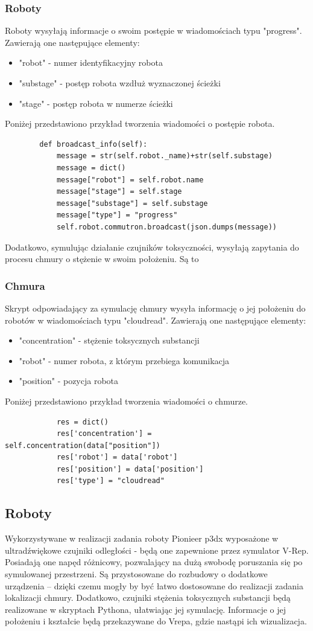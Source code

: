 \documentclass[a4paper, 12pt]{article}
\begin{document}
	\subsubsection{Roboty}
	Roboty wysyłają informacje o swoim postępie w wiadomościach typu "progress". Zawierają one następujące elementy:
	\begin{itemize}
	\item "robot" - numer identyfikacyjny robota
	\item "substage" - postęp robota wzdłuż wyznaczonej ścieżki
	\item "stage" - postęp robota w numerze ścieżki
	\end{itemize}
	Poniżej przedstawiono przykład tworzenia wiadomości o postępie robota.
	\begin{verbatim}
	    def broadcast_info(self):
	        message = str(self.robot._name)+str(self.substage)
	        message = dict()
	        message["robot"] = self.robot.name
	        message["stage"] = self.stage
	        message["substage"] = self.substage
	        message["type"] = "progress"
	        self.robot.commutron.broadcast(json.dumps(message))
	\end{verbatim}
	Dodatkowo, symulując działanie czujników toksyczności, wysyłają zapytania do procesu chmury o stężenie w swoim położeniu. Są to
	\subsubsection{Chmura}
	Skrypt odpowiadający za symulację chmury wysyła informację o jej położeniu do robotów w wiadomościach typu "cloudread".
	Zawierają one następujące elementy:
	\begin{itemize}
	\item "concentration" - stężenie toksycznych substancji
	\item "robot" - numer robota, z którym przebiega komunikacja
	\item "position" - pozycja robota
	\end{itemize}
	Poniżej przedstawiono przykład tworzenia wiadomości o chmurze.
	\begin{verbatim}
	        res = dict()
	        res['concentration'] = self.concentration(data["position"])
	        res['robot'] = data['robot']
	        res['position'] = data['position']
	        res['type'] = "cloudread"
	\end{verbatim}
	
	
	\subsection{Roboty}
	Wykorzystywane w realizacji zadania roboty Pionieer p3dx wyposażone w ultradźwiękowe czujniki odległości - będą one zapewnione przez symulator V-Rep. Posiadają one napęd różnicowy, pozwalający na dużą swobodę poruszania się po symulowanej przestrzeni. Są przystosowane do rozbudowy o dodatkowe urządzenia -- dzięki czemu mogły by być łatwo dostosowane do realizacji zadania lokalizacji chmury.
	Dodatkowo, czujniki stężenia toksycznych substancji będą realizowane w skryptach Pythona, ułatwiając jej symulację. Informacje o jej położeniu i kształcie będą przekazywane do Vrepa, gdzie nastąpi ich wizualizacja.
	
\end{document}
